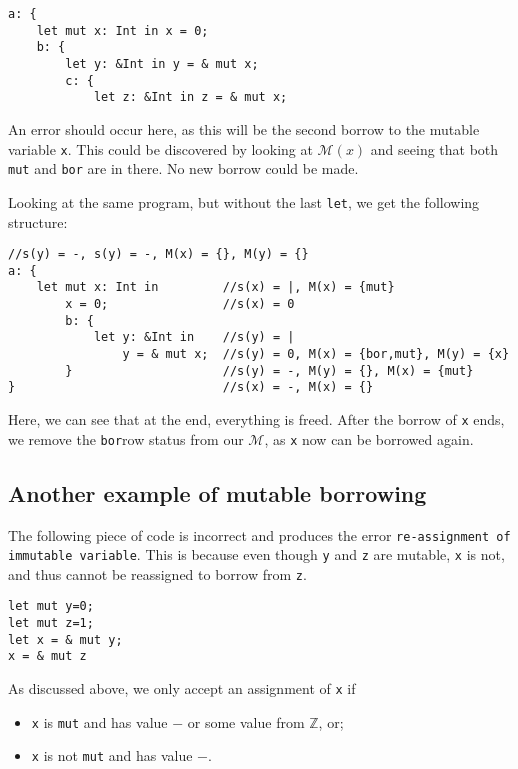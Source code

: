 \begin{verbatim}
a: {
    let mut x: Int in x = 0;
    b: {
        let y: &Int in y = & mut x;
        c: {
            let z: &Int in z = & mut x;
\end{verbatim}

An error should occur here, as this will be the second borrow to the mutable variable \texttt{x}. This could be discovered by looking at $\mathcal{M}(x)$ and seeing that both \texttt{mut} and \texttt{bor} are in there. No new borrow could be made. 

Looking at the same program, but without the last \texttt{let}, we get the following structure:

\begin{verbatim}
//s(y) = -, s(y) = -, M(x) = {}, M(y) = {}
a: {                          
    let mut x: Int in         //s(x) = |, M(x) = {mut}
        x = 0;                //s(x) = 0
        b: {
            let y: &Int in    //s(y) = |
                y = & mut x;  //s(y) = 0, M(x) = {bor,mut}, M(y) = {x}
        }                     //s(y) = -, M(y) = {}, M(x) = {mut}
}                             //s(x) = -, M(x) = {}
\end{verbatim}

Here, we can see that at the end, everything is freed. After the borrow of \texttt{x} ends, we remove the \texttt{bor}row status from our $\mathcal{M}$, as \texttt{x} now can be borrowed again. 

\subsection{Another example of mutable borrowing}
The following piece of code is incorrect and produces the error \texttt{re-assignment of immutable variable}. This is because even though \texttt{y} and \texttt{z} are mutable, \texttt{x} is not, and thus cannot be reassigned to borrow from \texttt{z}. 
\begin{verbatim}
let mut y=0;
let mut z=1;
let x = & mut y; 
x = & mut z
\end{verbatim}

As discussed above, we only accept an assignment of \texttt{x} if 
\begin{itemize}[noitemsep]
    \item \texttt{x} is \texttt{mut} and has value $-$ or some value from $\mathbb{Z}$, or;
    \item \texttt{x} is not \texttt{mut} and has value $-$.
\end{itemize}

